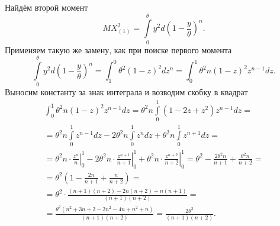 \begin{enumerate}[label=\alph*)]
Найдём второй момент
$$MX_{ \left( 1 \right) }^2 =
  \int \limits_0^{ \theta } y^2 d \left( 1 - \frac{y}{ \theta } \right)^n.$$
Применяем такую же замену, как при поиске первого момента
$$ \int \limits_0^{ \theta } y^2 d \left( 1 - \frac{y}{ \theta } \right)^n =
  \int_1^0 \theta^2 \left( 1 - z \right)^2 dz^n =
  \int_0^1 \theta^2 n \left( 1 - z \right)^2 z^{n - 1} dz.$$
Выносим константу за знак интеграла и возводим скобку в квадрат
\begin{equation*}
  \begin{split}
    \int_0^1 \theta^2 n \left( 1 - z \right)^2 z^{n - 1} dz =
    \theta^2 n \int \limits_0^1 \left( 1 - 2z + z^2 \right) z^{n - 1} dz = \\
    = \theta^2 n \int \limits_0^1 z^{n - 1} dz -
    2 \theta^2 n \int \limits_0^1 z^n dz +
    \theta^2 n \int \limits_0^1 z^{n + 1} dz = \\
    = \theta^2 n \cdot \left. \frac{z^n}{n} \right|_0^1 -
    2 \theta^2 n \cdot \left. \frac{z^{n + 1}}{n + 1} \right|_0^1 +
    \theta^2 n \cdot \left. \frac{z^{n + 2}}{n + 2} \right|_0^1 =
    \theta^2 - \frac{2 \theta^2 n}{n + 1} + \frac{ \theta^2 n}{n + 2} = \\
    = \theta^2 \left( 1 - \frac{2n}{n + 1} + \frac{n}{n + 2} \right) = \\
    = \theta^2 \cdot
    \frac{ \left( n + 1 \right) \left( n + 2 \right) - 2n \left( n + 2 \right) + n \left( n + 1 \right) }{ \left( n + 1 \right) \left( n + 2 \right) } = \\
    = \frac{ \theta^2 \left( n^2 + 3n + 2 - 2n^2 - 4n + n^2 + n \right) }{ \left( n + 1 \right) \left( n + 2 \right) } =
    \frac{2 \theta^2}{ \left( n + 1 \right) \left( n + 2 \right) }.
  \end{split}
\end{equation*}


\end{enumerate}
